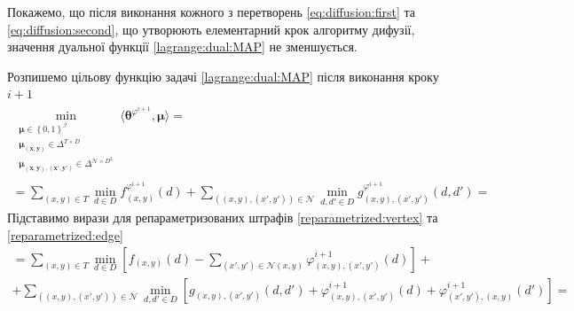 Покажемо, що після виконання кожного з перетворень \eqref{eq:diffusion:first}
та \eqref{eq:diffusion:second},
що утворюють елементарний крок алгоритму дифузії,
значення дуальної функції \eqref{lagrange:dual:MAP} не зменшується.

Розпишемо цільову функцію задачі \eqref{lagrange:dual:MAP}
після виконання кроку $i + 1$
\begin{equation*}
\begin{gathered}
    \min \limits_{\substack{\pmb{\mu} \in \left\{ 0, 1 \right\}^{\mathcal{I}} \\
                            \pmb{\mu_{\left(x, y \right)}} \in \Delta^{T \times D} \\
                            \pmb{\mu_{\left(x, y \right), \left(x', y' \right)}} \in
                                \Delta^{\mathcal{N} \times D^2}}}
        \langle \pmb{\theta}^{\varphi^{i + 1}}, \pmb{\mu} \rangle = \\
    = \sum \limits_{\left(x, y \right) \in T}
        \min \limits_{d \in D}
            f_{\left(x, y \right)}^{\varphi^{i + 1}} \left( d \right) +
    \sum \limits_{\left( \left(x, y \right), \left(x', y' \right) \right) \in \mathcal{N}}
        \min \limits_{d, d' \in D}
            g_{\left(x, y \right), \left(x', y' \right)}^{\varphi^{i + 1}}
                \left( d, d' \right) =
\end{gathered}
\end{equation*}
Підставимо вирази для репараметризованих штрафів \eqref{reparametrized:vertex}
та \eqref{reparametrized:edge}
\begin{equation*}
\begin{gathered}
    = \sum \limits_{\left(x, y \right) \in T}
        \min \limits_{d \in D} \left[
            f_{\left(x, y \right)} \left( d \right) -
            \sum \limits_{\left(x', y' \right) \in \mathcal{N} \left(x, y \right)}
                \varphi_{\left(x, y \right), \left(x', y' \right)}^{i + 1}
                    \left( d \right)
        \right] + \\
    + \sum \limits_{\left(\left(x, y \right), \left(x', y' \right) \right) \in \mathcal{N}}
        \min \limits_{d, d' \in D} \left[
            g_{\left(x, y \right), \left(x', y' \right)} \left(d, d' \right) +
            \varphi_{\left(x, y \right), \left(x', y' \right)}^{i + 1}
                \left( d \right) +
            \varphi_{\left(x', y' \right), \left(x, y \right)}^{i + 1}
                \left( d' \right)
        \right] =
\end{gathered}
\end{equation*}
